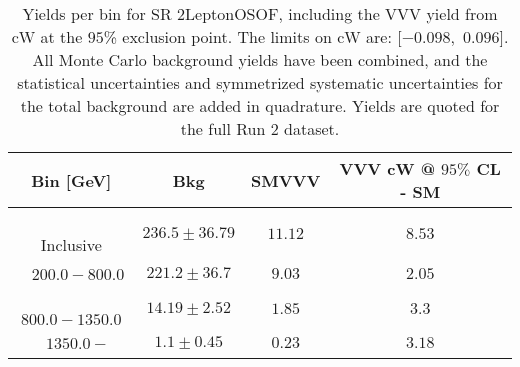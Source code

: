 \begin{table}[!htbp]
    \small
    \center
    \begin{tabular}{c||c|c|c}
    Bin [GeV] & Bkg & SMVVV & \pbox{20cm}{VVV \\ cW @ $95\%$ CL - SM \\ }\\
    \hline
    \pbox{20cm}{ ~ \\Inclusive\\ } & $236.5 \pm 36.79$ & $11.12$ & $8.53$\\
    \hline
    \pbox{20cm}{ ~ \\$200.0-800.0$\\ } & $221.2 \pm 36.7$ & $9.03$ & $2.05$\\
    \hline
    \pbox{20cm}{ ~ \\$800.0-1350.0$\\ } & $14.19 \pm 2.52$ & $1.85$ & $3.3$\\
    \hline
    \pbox{20cm}{ ~ \\$1350.0-$\\ } & $1.1 \pm 0.45$ & $0.23$ & $3.18$\\
\end{tabular}
    \caption{Yields per bin for SR 2LeptonOSOF, including the VVV yield from cW at the $95$\% exclusion point. The limits on cW are: [$-0.098$,~$0.096$]. All Monte Carlo background yields have been combined, and the statistical uncertainties and symmetrized systematic uncertainties for the total background are added in quadrature. Yields are quoted for the full Run 2 dataset.}
    \label{tab:2LeptonOSOF$binssignal}
\end{table}
